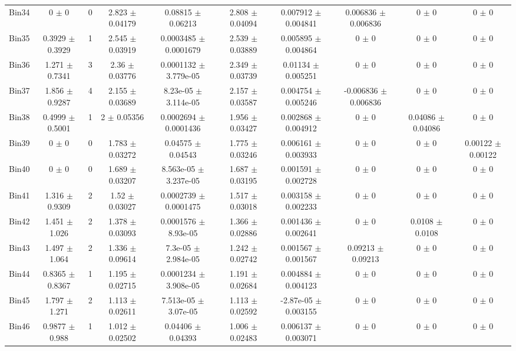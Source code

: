 \begin{tabular}{@{\extracolsep{4pt}}lccccccccc@{}}
     Bin34 & 0 $\pm$ 0 & 0 & 2.823 $\pm$ 0.04179 & 0.08815 $\pm$ 0.06213 & 2.808 $\pm$ 0.04094 & 0.007912 $\pm$ 0.004841 & 0.006836 $\pm$ 0.006836 & 0 $\pm$ 0 & 0 $\pm$ 0 \\ 
     Bin35 & 0.3929 $\pm$ 0.3929 & 1 & 2.545 $\pm$ 0.03919 & 0.0003485 $\pm$ 0.0001679 & 2.539 $\pm$ 0.03889 & 0.005895 $\pm$ 0.004864 & 0 $\pm$ 0 & 0 $\pm$ 0 & 0 $\pm$ 0 \\ 
     Bin36 & 1.271 $\pm$ 0.7341 & 3 & 2.36 $\pm$ 0.03776 & 0.0001132 $\pm$ 3.779e-05 & 2.349 $\pm$ 0.03739 & 0.01134 $\pm$ 0.005251 & 0 $\pm$ 0 & 0 $\pm$ 0 & 0 $\pm$ 0 \\ 
     Bin37 & 1.856 $\pm$ 0.9287 & 4 & 2.155 $\pm$ 0.03689 & 8.23e-05 $\pm$ 3.114e-05 & 2.157 $\pm$ 0.03587 & 0.004754 $\pm$ 0.005246 & -0.006836 $\pm$ 0.006836 & 0 $\pm$ 0 & 0 $\pm$ 0 \\ 
     Bin38 & 0.4999 $\pm$ 0.5001 & 1 & 2 $\pm$ 0.05356 & 0.0002694 $\pm$ 0.0001436 & 1.956 $\pm$ 0.03427 & 0.002868 $\pm$ 0.004912 & 0 $\pm$ 0 & 0.04086 $\pm$ 0.04086 & 0 $\pm$ 0 \\ 
     Bin39 & 0 $\pm$ 0 & 0 & 1.783 $\pm$ 0.03272 & 0.04575 $\pm$ 0.04543 & 1.775 $\pm$ 0.03246 & 0.006161 $\pm$ 0.003933 & 0 $\pm$ 0 & 0 $\pm$ 0 & 0.00122 $\pm$ 0.00122 \\ 
     Bin40 & 0 $\pm$ 0 & 0 & 1.689 $\pm$ 0.03207 & 8.563e-05 $\pm$ 3.237e-05 & 1.687 $\pm$ 0.03195 & 0.001591 $\pm$ 0.002728 & 0 $\pm$ 0 & 0 $\pm$ 0 & 0 $\pm$ 0 \\ 
     Bin41 & 1.316 $\pm$ 0.9309 & 2 & 1.52 $\pm$ 0.03027 & 0.0002739 $\pm$ 0.0001475 & 1.517 $\pm$ 0.03018 & 0.003158 $\pm$ 0.002233 & 0 $\pm$ 0 & 0 $\pm$ 0 & 0 $\pm$ 0 \\ 
     Bin42 & 1.451 $\pm$ 1.026 & 2 & 1.378 $\pm$ 0.03093 & 0.0001576 $\pm$ 8.93e-05 & 1.366 $\pm$ 0.02886 & 0.001436 $\pm$ 0.002641 & 0 $\pm$ 0 & 0.0108 $\pm$ 0.0108 & 0 $\pm$ 0 \\ 
     Bin43 & 1.497 $\pm$ 1.064 & 2 & 1.336 $\pm$ 0.09614 & 7.3e-05 $\pm$ 2.984e-05 & 1.242 $\pm$ 0.02742 & 0.001567 $\pm$ 0.001567 & 0.09213 $\pm$ 0.09213 & 0 $\pm$ 0 & 0 $\pm$ 0 \\ 
     Bin44 & 0.8365 $\pm$ 0.8367 & 1 & 1.195 $\pm$ 0.02715 & 0.0001234 $\pm$ 3.908e-05 & 1.191 $\pm$ 0.02684 & 0.004884 $\pm$ 0.004123 & 0 $\pm$ 0 & 0 $\pm$ 0 & 0 $\pm$ 0 \\ 
     Bin45 & 1.797 $\pm$ 1.271 & 2 & 1.113 $\pm$ 0.02611 & 7.513e-05 $\pm$ 3.07e-05 & 1.113 $\pm$ 0.02592 & -2.87e-05 $\pm$ 0.003155 & 0 $\pm$ 0 & 0 $\pm$ 0 & 0 $\pm$ 0 \\ 
     Bin46 & 0.9877 $\pm$ 0.988 & 1 & 1.012 $\pm$ 0.02502 & 0.04406 $\pm$ 0.04393 & 1.006 $\pm$ 0.02483 & 0.006137 $\pm$ 0.003071 & 0 $\pm$ 0 & 0 $\pm$ 0 & 0 $\pm$ 0 \\ 

\end{tabular}
